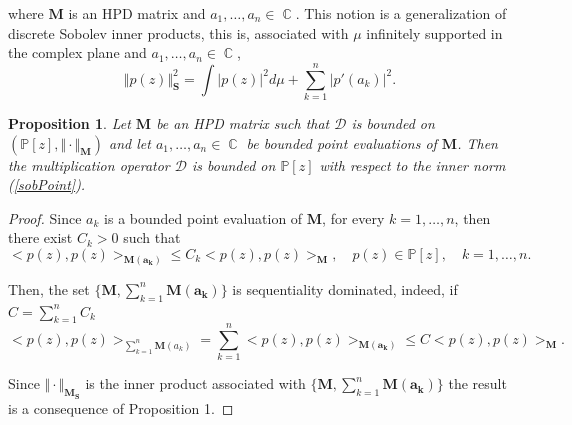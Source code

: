 \documentclass[12pt]{amsart}
\theoremstyle{definition}
\theoremstyle{plain}
\newtheorem{prop}{Proposition}
\theoremstyle{remark}
\DeclareMathOperator{\CC}{\mathbb C}
\begin{document}
\noindent where $\mathbf{M}$ is an HPD matrix and $a_1,\dots,a_n\in \CC$. This notion is a generalization of discrete Sobolev inner products, this is, associated with $\mu$  infinitely supported  in the complex plane and 
$a_1,\dots ,a_n\in \CC $, 
\begin{equation} \label{discrete}
\Vert p(z) \Vert^2_{\mathbf{S}}= \int \vert p(z) \vert^{2} d\mu + \sum_{k=1}^{n} \vert p'(a_k) \vert^{2}.
\end{equation}
\noindent 


\begin{prop} Let $\mathbf{M}$ be an HPD matrix such that  $\mathcal{D}$ is bounded on $(\mathbb{P}[z], \Vert \cdot \Vert_{\mathbf{M}})$ and let $a_1,\dots ,a_n\in \CC $ be bounded point evaluations of $\mathbf{M}$.  Then  the multiplication operator $\mathcal{D}$ is bounded on $\mathbb{P}[z]$ with respect to the   inner norm (\ref{sobPoint}).

\end{prop} 
\begin{proof} Since $a_k$ is a bounded point evaluation of $\mathbf{M}$, for every $k=1,\dots,n$,  then there exist  $C_k>0$ such that 
$$
<p(z),p(z)>_{\mathbf{M(a_k)}} \leq C_k <p(z),p(z)>_{\mathbf{M}}, \quad p(z)\in \mathbb{P}[z], \quad k=1,\dots,n.
$$

\noindent Then, the set $\{\mathbf{M},\sum_{k=1}^{n} \mathbf{M(a_k)}\}$ is sequentiality dominated, indeed, if $C=\sum_{k=1}^{n} C_k$
$$
<p(z),p(z)>_{\sum_{k=1}^n \mathbf{M}(a_k)} = \sum_{k=1}^{n}<p(z),p(z)>_{\mathbf{M(a_k)}} \leq C <p(z),p(z)>_{\mathbf{M}}.
$$

\noindent Since $\Vert \cdot \Vert_{\mathbf{M_S}}$ is the inner product associated with $\{\mathbf{M},\sum_{k=1}^{n} \mathbf{M(a_k)}\}$ the result is a consequence of Proposition 1. 
\end{proof}
\noindent 


\end{document}

